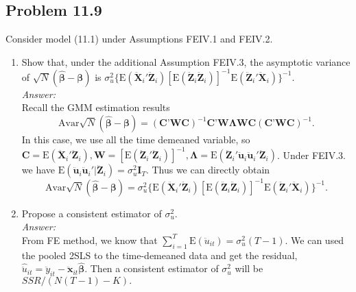 \documentclass[10pt]{article}
\newcommand{\E}{\text{E}}
\newcommand{\Av}{\text{Avar}}
\begin{document}
\subsection*{Problem 11.9}
Consider model (11.1) under Assumptions FEIV.1 and FEIV.2.
\begin{enumerate}[label=\alph*.]
\item Show that, under the additional Assumption FEIV.3, the asymptotic variance of $\sqrt{N}(\hat{\pmb{\beta}}-{\pmb{\beta}})$ is $\sigma_u^2\{\E(\ddot{\textbf{X}}_i'\ddot{\textbf{Z}}_i)[\E(\ddot{\textbf{Z}}_i\ddot{\textbf{Z}}_i)]^{-1}\E(\ddot{\textbf{Z}}_i'\ddot{\textbf{X}}_i)\}^{-1}$.
\\ \textit{Answer:}\\
Recall the GMM estimation results
\[\Av\sqrt{N}(\hat{\pmb{\beta}}-{\pmb{\beta}})=(\textbf{C'WC})^{-1}\textbf{C'W}\pmb{\Lambda}\textbf{WC}(\textbf{C'WC})^{-1}.\]
In this case, we use all the time demeaned variable, so $\textbf{C}=\E(\ddot{\textbf{X}}_i'\ddot{\textbf{Z}}_i),\textbf{W}=[\E(\ddot{\textbf{Z}}_i'\ddot{\textbf{Z}}_i)]^{-1},\pmb{\Lambda}=\E(\ddot{\textbf{Z}}_i'\ddot{\textbf{u}}_i\ddot{\textbf{u}}_i'\ddot{\textbf{Z}}_i)$. Under FEIV.3. we have $\E(\ddot{\textbf{u}}_i\ddot{\textbf{u}}_i'|\ddot{\textbf{Z}}_i)=\sigma_u^2 \textbf{I}_T$. Thus we can directly obtain
\[\Av\sqrt{N}(\hat{\pmb{\beta}}-{\pmb{\beta}})=\sigma_u^2\{\E(\ddot{\textbf{X}}_i'\ddot{\textbf{Z}}_i)[\E(\ddot{\textbf{Z}}_i\ddot{\textbf{Z}}_i)]^{-1}\E(\ddot{\textbf{Z}}_i'\ddot{\textbf{X}}_i)\}^{-1}.\]

\item Propose a consistent estimator of $\sigma_u^2$.
\\ \textit{Answer:}\\
From FE method, we know that $\sum_{i=1}^T\E(\ddot{u}_{it})=\sigma_u^2(T-1)$. We can used the pooled 2SLS to the time-demeaned data and get the residual, $\hat{\ddot{u}}_{it}=\ddot{y}_{it}-\ddot{\textbf{x}}_{it}\hat{\pmb{\beta}}.$ Then a consistent estimator of $\sigma_u^2$ will be $SSR/(N(T-1)-K).$


\end{enumerate}
\end{document}
